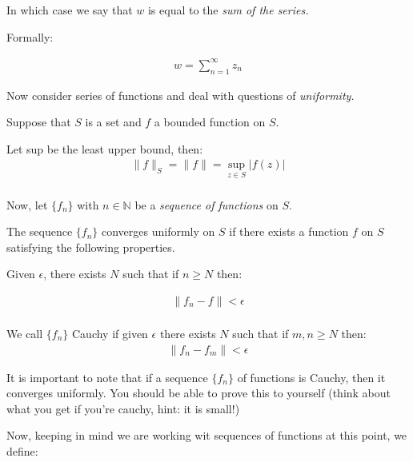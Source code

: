 In which case we say that $w$ is equal to the \emph{sum of the series.}

Formally:

\begin{defn}
  \begin{align*}
    w = \sum_{n = 1}^{\infty} z_n
  \end{align*}
\end{defn}

Now consider series of functions and deal with questions of \emph{uniformity.}

Suppose that $S$ is a set and $f$ a bounded function on $S$.

\begin{defn}
  Let sup be the least upper bound, then:
  \begin{align*}
    \| f \|_S = \| f \| = \sup_{z \in S} | f(z) | \\
  \end{align*}
\end{defn}

Now, let $\{ f_n \}$ with $n \in \mathbb{N}$ be a \emph{sequence of functions} on $S$.

\begin{defn}
  The sequence $ \{ f_n \}$ converges uniformly on $S$ if there exists a 
  function $f$ on $S$ satisfying the following properties.

  Given $\epsilon$, there exists $N$ such that if $n \geq N$ then:

  \begin{align*}
    \| f_n - f \| < \epsilon \\
  \end{align*}
\end{defn}

\begin{defn}
  We call $\{f_n\}$ Cauchy if given $\epsilon$ there exists $N$ such that if $m, n \geq N$ then:
  \begin{align*}
    \| f_n - f_m \| < \epsilon
  \end{align*}
\end{defn}

It is important to note that if a sequence $\{f_n\}$ of functions is Cauchy, then it converges 
uniformly. You should be able to prove this to yourself (think about what you get if you're cauchy, hint: it 
is small!)

Now, keeping in mind we are working wit sequences of functions at this point, we define:

